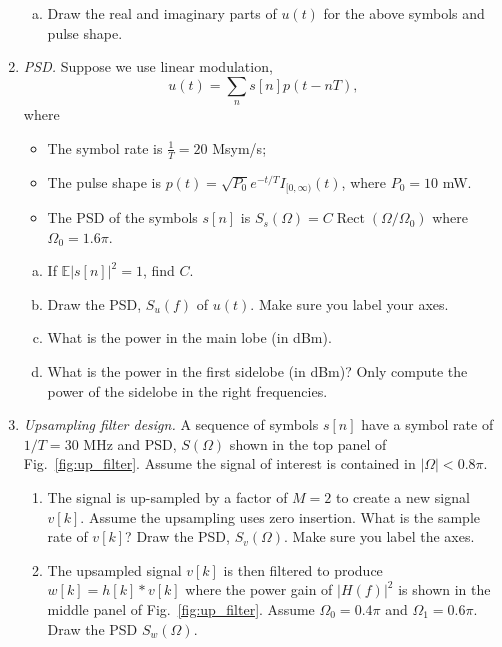 \documentclass[11pt]{article}
\def\Exp{\mathbb{E}}
\def\Rect{\mathop{Rect}}
\begin{document}
\begin{enumerate}
\begin{enumerate}[(a)]
\item Draw the real and imaginary parts of $u(t)$ for the above symbols
and pulse shape.
\end{enumerate}


\item \emph{PSD.}  Suppose we use linear modulation,
\[
    u(t) = \sum_n s[n]p(t-nT),
\]
where
\begin{itemize}
\item The symbol rate is $\frac{1}{T}=20$ Msym/s;
\item The pulse shape is
$p(t)=\sqrt{P_0}e^{-t/T}I_{[0,\infty)}(t)$, where $P_0 = 10$ mW.
\item   The PSD of the symbols $s[n]$
is $S_s(\Omega) = C\Rect(\Omega/\Omega_0)$ where $\Omega_0 = 1.6\pi$.
\end{itemize}

\begin{enumerate}[(a)]

\item If $\Exp|s[n]|^2 = 1$, find $C$.

\item Draw the PSD, $S_u(f)$ of $u(t)$.
Make sure you label your axes.

\item What is the power in the main lobe (in dBm).

\item What is the power in the first sidelobe (in dBm)?  Only compute the power
of the sidelobe in the right frequencies.
\end{enumerate}

\item \label{prob:up_filter}
\emph{Upsampling filter design.}  
A sequence of symbols $s[n]$ have a symbol rate of $1/T=30$ MHz and PSD, $S(\Omega)$ shown in 
the top panel of Fig.~\ref{fig:up_filter}.  Assume the signal of interest
is contained in $|\Omega| < 0.8\pi$.  
 
\begin{enumerate}
\item The signal is up-sampled by a factor of $M=2$ to create a new signal $v[k]$.
Assume the upsampling uses zero insertion.
What is the sample rate of $v[k]$?
Draw the PSD, $S_v(\Omega)$.  Make sure you label the axes.

\item The upsampled signal $v[k]$ is then filtered to produce $w[k] = h[k]*v[k]$ 
where the power gain of $|H(f)|^2$ is shown in the middle panel of Fig.~\ref{fig:up_filter}.
Assume $\Omega_0=0.4\pi$ and $\Omega_1=0.6\pi$.
Draw the PSD $S_w(\Omega)$.


\end{enumerate}
\end{enumerate}
\end{document}
